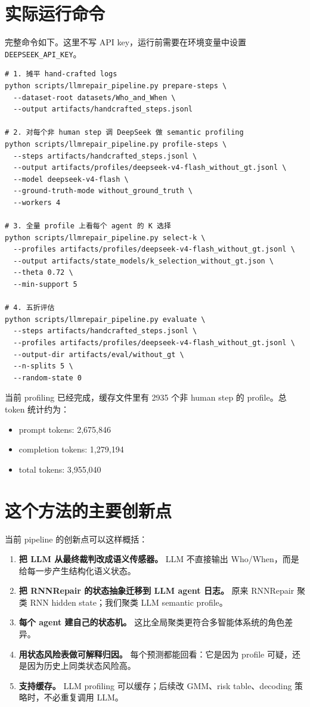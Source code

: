 \documentclass[UTF8,a4paper,11pt]{ctexart}
\begin{document}
\section{实际运行命令}

完整命令如下。这里不写 API key，运行前需要在环境变量中设置 \texttt{DEEPSEEK\_API\_KEY}。

\begin{verbatim}
# 1. 摊平 hand-crafted logs
python scripts/llmrepair_pipeline.py prepare-steps \
  --dataset-root datasets/Who_and_When \
  --output artifacts/handcrafted_steps.jsonl

# 2. 对每个非 human step 调 DeepSeek 做 semantic profiling
python scripts/llmrepair_pipeline.py profile-steps \
  --steps artifacts/handcrafted_steps.jsonl \
  --output artifacts/profiles/deepseek-v4-flash_without_gt.jsonl \
  --model deepseek-v4-flash \
  --ground-truth-mode without_ground_truth \
  --workers 4

# 3. 全量 profile 上看每个 agent 的 K 选择
python scripts/llmrepair_pipeline.py select-k \
  --profiles artifacts/profiles/deepseek-v4-flash_without_gt.jsonl \
  --output artifacts/state_models/k_selection_without_gt.json \
  --theta 0.72 \
  --min-support 5

# 4. 五折评估
python scripts/llmrepair_pipeline.py evaluate \
  --steps artifacts/handcrafted_steps.jsonl \
  --profiles artifacts/profiles/deepseek-v4-flash_without_gt.jsonl \
  --output-dir artifacts/eval/without_gt \
  --n-splits 5 \
  --random-state 0
\end{verbatim}

当前 profiling 已经完成，缓存文件里有 2935 个非 human step 的 profile。总 token 统计约为：

\begin{itemize}
  \item prompt tokens: 2,675,846
  \item completion tokens: 1,279,194
  \item total tokens: 3,955,040
\end{itemize}

\section{这个方法的主要创新点}

当前 pipeline 的创新点可以这样概括：

\begin{enumerate}
  \item \textbf{把 LLM 从最终裁判改成语义传感器。} LLM 不直接输出 Who/When，而是给每一步产生结构化语义状态。
  \item \textbf{把 RNNRepair 的状态抽象迁移到 LLM agent 日志。} 原来 RNNRepair 聚类 RNN hidden state；我们聚类 LLM semantic profile。
  \item \textbf{每个 agent 建自己的状态机。} 这比全局聚类更符合多智能体系统的角色差异。
  \item \textbf{用状态风险表做可解释归因。} 每个预测都能回看：它是因为 profile 可疑，还是因为历史上同类状态风险高。
  \item \textbf{支持缓存。} LLM profiling 可以缓存；后续改 GMM、risk table、decoding 策略时，不必重复调用 LLM。
\end{enumerate}
\end{document}
